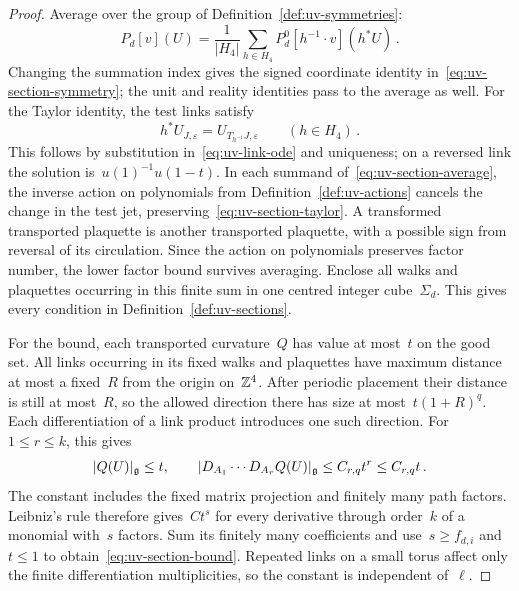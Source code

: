 \begin{proof}
Average over the group of Definition~\ref{def:uv-symmetries}:
\begin{equation}\label{eq:uv-section-average}
 P_d[v](U)=\frac{1}{|H_4|}\sum_{h\in H_4}P_d^0[h^{-1}\cdot v](h^*U)\,.
\end{equation}
Changing the summation index gives the signed coordinate identity in~\eqref{eq:uv-section-symmetry}; the unit and reality identities pass to the average as well.
For the Taylor identity, the test links satisfy
\begin{equation}\label{eq:uv-holonomy-covariance}
 h^*U_{J,\varepsilon}=U_{T_{h^{-1}}J,\varepsilon}\qquad(h\in H_4)\,.
\end{equation}
This follows by substitution in~\eqref{eq:uv-link-ode} and uniqueness; on a reversed link the solution is~$u(1)^{-1}u(1-t)$.
In each summand of~\eqref{eq:uv-section-average}, the inverse action on polynomials from Definition~\ref{def:uv-actions} cancels the change in the test jet, preserving~\eqref{eq:uv-section-taylor}.
A transformed transported plaquette is another transported plaquette, with a possible sign from reversal of its circulation.
Since the action on polynomials preserves factor number, the lower factor bound survives averaging.
Enclose all walks and plaquettes occurring in this finite sum in one centred integer cube~$\Sigma_d$.
This gives every condition in Definition~\ref{def:uv-sections}.

For the bound, each transported curvature~$Q$ has value at most~$t$ on the good set.
All links occurring in its fixed walks and plaquettes have maximum distance at most a fixed~$R$ from the origin on~$\mathbb Z^4$.
After periodic placement their distance is still at most~$R$, so the allowed direction there has size at most~$t(1+R)^q$.
Each differentiation of a link product introduces one such direction.
For~$1\le r\le k$, this gives
\begin{equation}\label{eq:uv-factor-derivatives}
 |Q(U)|_\mathfrak g\le t,\qquad
 |D_{A_1}\cdots D_{A_r}Q(U)|_\mathfrak g\le C_{r,q}t^r\le C_{r,q}t\,.
\end{equation}
The constant includes the fixed matrix projection and finitely many path factors.
Leibniz's rule therefore gives~$Ct^s$ for every derivative through order~$k$ of a monomial with~$s$ factors.
Sum its finitely many coefficients and use~$s\ge f_{d,i}$ and~$t\le1$ to obtain~\eqref{eq:uv-section-bound}.
Repeated links on a small torus affect only the finite differentiation multiplicities, so the constant is independent of~$\ell$.
\end{proof}

